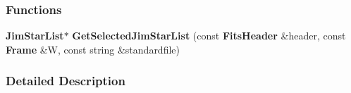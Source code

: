 \subsubsection*{Functions}
\begin{CompactItemize}
\item 
{}
{\bf Jim\-Star\-List}$\ast$ {\bf Get\-Selected\-Jim\-Star\-List} (const {\bf Fits\-Header} \&header, const {\bf Frame} \&W, const string \&standardfile)\label{jimstar_h_a3}

\end{CompactItemize}


\subsubsection{Detailed Description}


